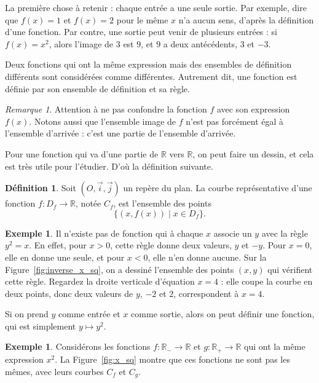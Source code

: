 \documentclass[12pt,a4paper]{article}
\theoremstyle{plain}
\theoremstyle{definition}
\newtheorem{definition}[theorem]{Définition}
\newtheorem{example}[theorem]{Exemple}
\theoremstyle{remark}
\newtheorem*{remark}{Remarque}
\begin{document}
La première chose à retenir : chaque entrée a une seule sortie.
Par exemple, dire que $f(x) = 1$ et $f(x) = 2$ pour le même $x$ n'a aucun sens,
d'après la définition d'une fonction. Par contre, une sortie peut venir de
plusieurs entrées : si $f(x) = x^2$, alors l'image de $3$ est $9$, et $9$ a deux
antécédents, $3$ et $-3$.

Deux fonctions qui ont la même expression mais des ensembles de définition
différents sont considérées comme différentes. Autrement dit, une fonction est
définie par son ensemble de définition et sa règle.

\begin{remark}
  Attention à ne pas confondre la fonction $f$ avec son expression $f(x)$.
  Notons aussi que l'ensemble image de $f$ n'est pas forcément égal à
  l'ensemble d'arrivée : c'est une partie de l'ensemble d'arrivée.
\end{remark}

Pour une fonction qui va d'une partie de $\mathbb{R}$ vers $\mathbb{R}$, on peut
faire un dessin, et cela est très utile pour l'étudier. D'où la définition suivante.
\begin{tcolorbox}[navybar]
  \begin{definition}
    Soit $(O, \vec{i}, \vec{j})$ un repère du plan. La courbe représentative d'une
    fonction $f : D_f \rightarrow \mathbb{R}$, notée $C_f$, est l'ensemble des points
    \[
    \{(x, f(x)) \mid x \in D_f\}.
    \]
  \end{definition}
\end{tcolorbox}

\begin{example}
  Il n'existe pas de fonction qui à chaque $x$ associe un $y$ avec la règle
  $y^2 = x$. En effet, pour $x > 0$, cette règle donne deux valeurs, $y$ et $-y$.
  Pour $x = 0$, elle en donne une seule, et pour $x < 0$, elle n'en donne aucune.
  Sur la Figure~\ref{fig:inverse_x_sq}, on a dessiné l'ensemble des points
  $(x,y)$ qui vérifient cette règle. Regardez la droite verticale d'équation
  $x=4$ : elle coupe la courbe en deux points, donc deux valeurs de $y$, $-2$ et $2$,
  correspondent à $x = 4$.
  
  Si on prend $y$ comme entrée et $x$ comme sortie, alors on peut définir une
  fonction, qui est simplement $y \mapsto y^2$.
\end{example}

\begin{example}
  \label{eg:f_et_g} %
  Considérons les fonctions $f : \mathbb{R}_- \rightarrow \mathbb{R}$ et
  $g : \mathbb{R}_+ \rightarrow \mathbb{R}$ qui ont la même expression $x^2$.
  La Figure~\ref{fig:x_sq} montre que ces fonctions ne sont pas les mêmes, avec
  leurs courbes $C_f$ et $C_g$.
\end{example}
\end{document}
